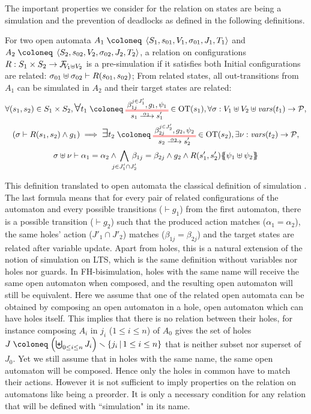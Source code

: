 \documentclass{article}
\begin{document}
The important properties we consider for the relation on states are being a simulation and the prevention of deadlocks as defined in the following definitions.
\begin{defi}
For two open automata \(A_1 \defobject \OAg[1]\) and \(A_2 \defobject \OAg[2]\), a relation on configurations \(R: S_1 \times S_2 \to \rformulas[V_1 \uplus V_2]\) is a pre-simulation if it satisfies both
 Initial configurations are related: \(\sigma_{01} \uplus \sigma_{02} \vdash R\mpar{s_{01}, s_{02}}\);
 From related states, all out-transitions from \(A_1\) can be simulated in \(A_2\) and their target states are related:
\begin{multline*}
	\forall \mpar{s_1, s_2} \in S_1 \times S_2, \bigsymb{\forall} t_1 \defobject \OTx{1}{}{1}{1} \in \fOT{s_1}, \forall \sigma: V_1 \uplus V_2 \uplus \fvars{t_1} \to \values, \\
	\mpar{\sigma \vdash R\mpar{s_1, s_2} \wedge g_1} \implies \bigsymb{\exists} t_2 \defobject \OTx{2}{}{2}{2} \in \fOT{s_2}, \exists \nu: \fvars{t_2} \to \values, \\
	\sigma \uplus \nu \vdash \alpha_1 = \alpha_2 \wedge \bigwedge_\subbox{j \in J'_1 \cap J'_2} \beta_{1j} = \beta_{2j} \wedge g_2 \wedge R\mpar{s'_1, s'_2}\psubst{\psi_1 \uplus \psi_2}
\end{multline*}
\end{defi}
This definition translated to open automata the classical definition of simulation .
The last formula means that for every pair of related configurations of the automaton and every possible transitions (\(\vdash g_1\)) from the first automaton, there is a possible transition (\(\vdash g_2\)) such that the produced action matches (\(\alpha_1 = \alpha_2\)), the same holes' action (\(J'_1 \cap J'_2\)) matches (\(\beta_{1j} = \beta_{2j}\)) and the target states are related after variable update. %
Apart from holes, this is a natural extension of the notion of simulation on LTS, which is the same definition without variables nor holes nor guards.
In FH-bisimulation, holes with the same name will receive the same open automaton when composed, and the resulting open automaton will still be equivalent.
Here we assume that one of the related open automata can be obtained by composing an open automaton in a hole, open automaton which can have holes itself.
This implies that there is no relation between their holes, for instance composing \(A_i\) in \(j_i\) (\(1 \leq i \leq n\)) of \(A_0\) gives the set of holes \(J \defobject \mpar{\biguplus_{0 \leq i \leq n} J_i} \setminus \mset{j_i}{1 \leq i \leq n} \) that is neither subset nor superset of \(J_0\).
Yet we still assume that in holes with the same name, the same open automaton will be composed.
Hence only the holes in common have to match their actions.
However it is not sufficient to imply properties on the relation on automatons like being a preorder.
It is only a necessary condition for any relation that will be defined with ``simulation" in its name.
\end{document}
